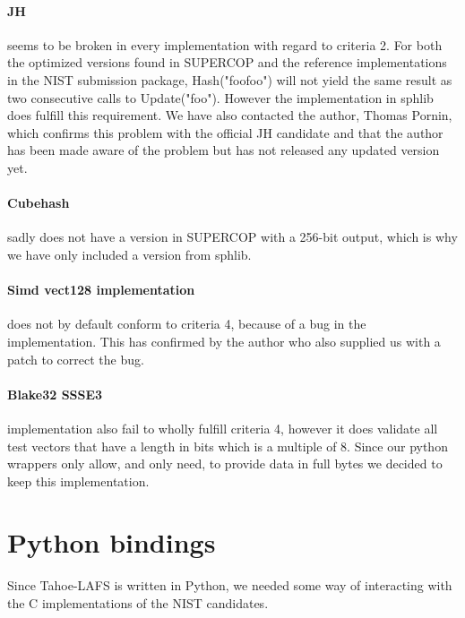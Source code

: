 \documentclass[english,12pt,a4paper]{book}
\begin{document}
\paragraph{JH} seems to be broken in every implementation with regard to
criteria 2. For both the optimized versions found in \ac{SUPERCOP} and the
reference implementations in the \ac{NIST} submission package, Hash("foofoo")
will not yield the same result as two consecutive calls to Update("foo").
However the implementation in sphlib does fulfill this requirement. We have
also contacted the author, Thomas Pornin, which confirms this problem with the
official JH candidate and that the author has been made aware of the problem
but has not released any updated version yet.

\paragraph{Cubehash} sadly does not have a version in \ac{SUPERCOP} with a 256-bit
output, which is why we have only included a version from sphlib.

\paragraph{Simd vect128 implementation} does not by default conform to
criteria 4, because of a bug in the implementation. This has confirmed by the
author who also supplied us with a patch to correct the bug.

\paragraph{Blake32 \ac{SSSE3}} implementation also fail to wholly fulfill
criteria 4, however it does validate all test vectors that have a length 
in bits which is a multiple of 8. Since our python wrappers only allow, and
only need, to provide data in full bytes we decided to keep this
implementation.




\section{Python bindings}

Since Tahoe-\ac{LAFS} is written in Python, we needed some way of interacting
with the C implementations of the NIST candidates.
\end{document}
